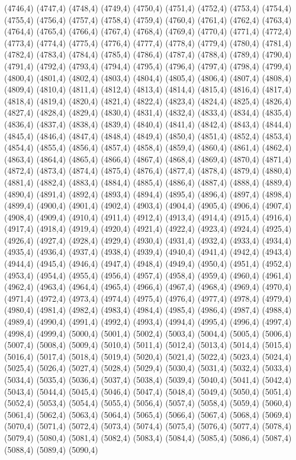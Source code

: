 (4746,4)
(4747,4)
(4748,4)
(4749,4)
(4750,4)
(4751,4)
(4752,4)
(4753,4)
(4754,4)
(4755,4)
(4756,4)
(4757,4)
(4758,4)
(4759,4)
(4760,4)
(4761,4)
(4762,4)
(4763,4)
(4764,4)
(4765,4)
(4766,4)
(4767,4)
(4768,4)
(4769,4)
(4770,4)
(4771,4)
(4772,4)
(4773,4)
(4774,4)
(4775,4)
(4776,4)
(4777,4)
(4778,4)
(4779,4)
(4780,4)
(4781,4)
(4782,4)
(4783,4)
(4784,4)
(4785,4)
(4786,4)
(4787,4)
(4788,4)
(4789,4)
(4790,4)
(4791,4)
(4792,4)
(4793,4)
(4794,4)
(4795,4)
(4796,4)
(4797,4)
(4798,4)
(4799,4)
(4800,4)
(4801,4)
(4802,4)
(4803,4)
(4804,4)
(4805,4)
(4806,4)
(4807,4)
(4808,4)
(4809,4)
(4810,4)
(4811,4)
(4812,4)
(4813,4)
(4814,4)
(4815,4)
(4816,4)
(4817,4)
(4818,4)
(4819,4)
(4820,4)
(4821,4)
(4822,4)
(4823,4)
(4824,4)
(4825,4)
(4826,4)
(4827,4)
(4828,4)
(4829,4)
(4830,4)
(4831,4)
(4832,4)
(4833,4)
(4834,4)
(4835,4)
(4836,4)
(4837,4)
(4838,4)
(4839,4)
(4840,4)
(4841,4)
(4842,4)
(4843,4)
(4844,4)
(4845,4)
(4846,4)
(4847,4)
(4848,4)
(4849,4)
(4850,4)
(4851,4)
(4852,4)
(4853,4)
(4854,4)
(4855,4)
(4856,4)
(4857,4)
(4858,4)
(4859,4)
(4860,4)
(4861,4)
(4862,4)
(4863,4)
(4864,4)
(4865,4)
(4866,4)
(4867,4)
(4868,4)
(4869,4)
(4870,4)
(4871,4)
(4872,4)
(4873,4)
(4874,4)
(4875,4)
(4876,4)
(4877,4)
(4878,4)
(4879,4)
(4880,4)
(4881,4)
(4882,4)
(4883,4)
(4884,4)
(4885,4)
(4886,4)
(4887,4)
(4888,4)
(4889,4)
(4890,4)
(4891,4)
(4892,4)
(4893,4)
(4894,4)
(4895,4)
(4896,4)
(4897,4)
(4898,4)
(4899,4)
(4900,4)
(4901,4)
(4902,4)
(4903,4)
(4904,4)
(4905,4)
(4906,4)
(4907,4)
(4908,4)
(4909,4)
(4910,4)
(4911,4)
(4912,4)
(4913,4)
(4914,4)
(4915,4)
(4916,4)
(4917,4)
(4918,4)
(4919,4)
(4920,4)
(4921,4)
(4922,4)
(4923,4)
(4924,4)
(4925,4)
(4926,4)
(4927,4)
(4928,4)
(4929,4)
(4930,4)
(4931,4)
(4932,4)
(4933,4)
(4934,4)
(4935,4)
(4936,4)
(4937,4)
(4938,4)
(4939,4)
(4940,4)
(4941,4)
(4942,4)
(4943,4)
(4944,4)
(4945,4)
(4946,4)
(4947,4)
(4948,4)
(4949,4)
(4950,4)
(4951,4)
(4952,4)
(4953,4)
(4954,4)
(4955,4)
(4956,4)
(4957,4)
(4958,4)
(4959,4)
(4960,4)
(4961,4)
(4962,4)
(4963,4)
(4964,4)
(4965,4)
(4966,4)
(4967,4)
(4968,4)
(4969,4)
(4970,4)
(4971,4)
(4972,4)
(4973,4)
(4974,4)
(4975,4)
(4976,4)
(4977,4)
(4978,4)
(4979,4)
(4980,4)
(4981,4)
(4982,4)
(4983,4)
(4984,4)
(4985,4)
(4986,4)
(4987,4)
(4988,4)
(4989,4)
(4990,4)
(4991,4)
(4992,4)
(4993,4)
(4994,4)
(4995,4)
(4996,4)
(4997,4)
(4998,4)
(4999,4)
(5000,4)
(5001,4)
(5002,4)
(5003,4)
(5004,4)
(5005,4)
(5006,4)
(5007,4)
(5008,4)
(5009,4)
(5010,4)
(5011,4)
(5012,4)
(5013,4)
(5014,4)
(5015,4)
(5016,4)
(5017,4)
(5018,4)
(5019,4)
(5020,4)
(5021,4)
(5022,4)
(5023,4)
(5024,4)
(5025,4)
(5026,4)
(5027,4)
(5028,4)
(5029,4)
(5030,4)
(5031,4)
(5032,4)
(5033,4)
(5034,4)
(5035,4)
(5036,4)
(5037,4)
(5038,4)
(5039,4)
(5040,4)
(5041,4)
(5042,4)
(5043,4)
(5044,4)
(5045,4)
(5046,4)
(5047,4)
(5048,4)
(5049,4)
(5050,4)
(5051,4)
(5052,4)
(5053,4)
(5054,4)
(5055,4)
(5056,4)
(5057,4)
(5058,4)
(5059,4)
(5060,4)
(5061,4)
(5062,4)
(5063,4)
(5064,4)
(5065,4)
(5066,4)
(5067,4)
(5068,4)
(5069,4)
(5070,4)
(5071,4)
(5072,4)
(5073,4)
(5074,4)
(5075,4)
(5076,4)
(5077,4)
(5078,4)
(5079,4)
(5080,4)
(5081,4)
(5082,4)
(5083,4)
(5084,4)
(5085,4)
(5086,4)
(5087,4)
(5088,4)
(5089,4)
(5090,4)
